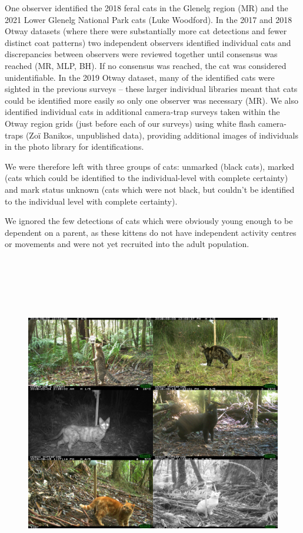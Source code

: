 \documentclass[11pt,a4paper,titlepage,twoside,openright]{style/unimelbthesis}
\begin{document}
\begin{mainmatter}
One observer identified the 2018 feral cats in the Glenelg region (MR) and the 2021 Lower Glenelg National Park cats (Luke Woodford). In the 2017 and 2018 Otway datasets (where there were substantially more cat detections and fewer distinct coat patterns) two independent observers identified individual cats and discrepancies between observers were reviewed together until consensus was reached (MR, MLP, BH). If no consensus was reached, the cat was considered unidentifiable. In the 2019 Otway dataset, many of the identified cats were sighted in the previous surveys -- these larger individual libraries meant that cats could be identified more easily so only one observer was necessary (MR). We also identified individual cats in additional camera-trap surveys taken within the Otway region grids (just before each of our surveys) using white flash camera-traps (Zoï Banikos, unpublished data), providing additional images of individuals in the photo library for identifications.

We were therefore left with three groups of cats: unmarked (black cats), marked (cats which could be identified to the individual-level with complete certainty) and mark status unknown (cats which were not black, but couldn't be identified to the individual level with complete certainty).

We ignored the few detections of cats which were obviously young enough to be dependent on a parent, as these kittens do not have independent activity centres or movements and were not yet recruited into the adult population.

\newpage

\(~\)

\(~\)

\(~\)
\begin{figure}

{\centering \includegraphics[width=1\linewidth]{figure/cat_coats} 

}
\end{figure}
\end{mainmatter}
\end{document}
